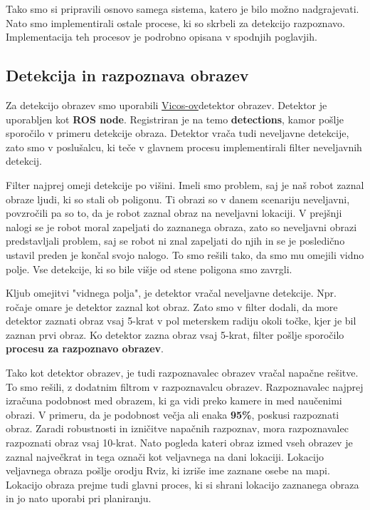 \documentclass[a4paper,11pt]{article}
\begin{document}
Tako smo si pripravili osnovo samega sistema, katero je bilo možno nadgrajevati. Nato smo implementirali ostale procese, ki so skrbeli za detekcijo razpoznavo. Implementacija teh procesov je podrobno opisana v spodnjih poglavjih.

\subsection{Detekcija in razpoznava obrazev}

Za detekcijo obrazev smo uporabili \href{https://github.com/vicoslab/vicos_ros}{Vicos-ov}detektor obrazev. Detektor je uporabljen kot \textbf{ROS node}. Registriran je na temo \textbf{detections}, kamor pošlje sporočilo v primeru detekcije obraza. Detektor vrača tudi neveljavne detekcije, zato smo v poslušalcu, ki teče v glavnem procesu implementirali filter neveljavnih detekcij.

Filter najprej omeji detekcije po višini. Imeli smo problem, saj je naš robot zaznal obraze ljudi, ki so stali ob poligonu. Ti obrazi so v danem scenariju neveljavni, povzročili pa so to, da je robot zaznal obraz na neveljavni lokaciji. V prejšnji nalogi se je robot moral zapeljati do zaznanega obraza, zato so neveljavni obrazi predstavljali problem, saj se robot ni znal zapeljati do njih in se je posledično ustavil preden je končal svojo nalogo. To smo rešili tako, da smo mu omejili vidno polje. Vse detekcije, ki so bile višje od stene poligona smo zavrgli. 

Kljub omejitvi "vidnega polja", je detektor vračal neveljavne detekcije. Npr. ročaje omare je detektor zaznal kot obraz. Zato smo v filter dodali, da more detektor zaznati obraz vsaj 5-krat v pol meterskem radiju okoli točke, kjer je bil zaznan prvi obraz. Ko detektor zazna obraz vsaj 5-krat, filter pošlje sporočilo \textbf{procesu za razpoznavo obrazev}. 

Tako kot detektor obrazev, je tudi razpoznavalec obrazev vračal napačne rešitve. To smo rešili, z dodatnim filtrom v razpoznavalcu obrazev. Razpoznavalec najprej izračuna podobnost med obrazem, ki ga vidi preko kamere in med naučenimi obrazi. V primeru, da je podobnost večja ali enaka \textbf{95\%}, poskusi razpoznati obraz. Zaradi robustnosti in izničitve napačnih razpoznav, mora razpoznavalec razpoznati obraz vsaj 10-krat. Nato pogleda kateri obraz izmed vseh obrazev je zaznal največkrat in tega označi kot veljavnega na dani lokaciji. Lokacijo veljavnega obraza pošlje orodju Rviz, ki izriše ime zaznane osebe na mapi. Lokacijo obraza prejme tudi glavni proces, ki si shrani lokacijo zaznanega obraza in jo nato uporabi pri planiranju.
 
\end{document}
